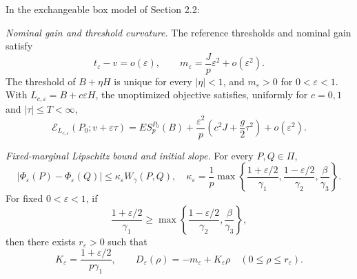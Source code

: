 \begin{proposition}\label{prop:nominal-benchmark}
In the exchangeable box model of Section 2.2:
\begin{resultparts}
\item \emph{Nominal gain and threshold curvature.} The reference thresholds and nominal gain satisfy
\begin{equation}
t_\varepsilon-v=o(\varepsilon),\qquad
m_\varepsilon=\frac Jp\varepsilon^2+o(\varepsilon^2).
\tag{2.6}\label{eq:2.6}
\end{equation}
The threshold of \(B+\eta H\) is unique for every \(|\eta|<1\), and \(m_\varepsilon>0\) for \(0<\varepsilon<1\). With \(L_{c,\varepsilon}=B+c\varepsilon H\), the unoptimized objective satisfies, uniformly for \(c=0,1\) and \(|\tau|\le T<\infty\),
\begin{equation}
\mathscr E_{L_{c,\varepsilon}}(P_0;v+\varepsilon\tau)
=ES_p^{P_0}(B)+\frac{\varepsilon^2}{p}
\left(c^2J+\frac g2\tau^2\right)+o(\varepsilon^2).
\tag{2.7}\label{eq:2.7}
\end{equation}
\item \emph{Fixed-marginal Lipschitz bound and initial slope.} For every \(P,Q\in\Pi\),
\begin{equation}
|\Phi_\varepsilon(P)-\Phi_\varepsilon(Q)|\le \kappa_\varepsilon W_\gamma(P,Q),\quad
\kappa_\varepsilon=\frac1p\max\left\{\frac{1+\varepsilon/2}{\gamma_1},
\frac{1-\varepsilon/2}{\gamma_2},\frac\beta{\gamma_3}\right\}.
\tag{2.8}\label{eq:2.8}
\end{equation}
For fixed \(0<\varepsilon<1\), if
\begin{equation}
\frac{1+\varepsilon/2}{\gamma_1}
\ge\max\left\{\frac{1-\varepsilon/2}{\gamma_2},\frac\beta{\gamma_3}\right\},
\tag{2.9}\label{eq:2.9}
\end{equation}
then there exists \(r_\varepsilon>0\) such that
\begin{equation}
K_\varepsilon=\frac{1+\varepsilon/2}{p\gamma_1},\qquad
D_\varepsilon(\rho)=-m_\varepsilon+K_\varepsilon\rho
\quad(0\le\rho\le r_\varepsilon).
\tag{2.10}\label{eq:2.10}
\end{equation}
\end{resultparts}
\end{proposition}
